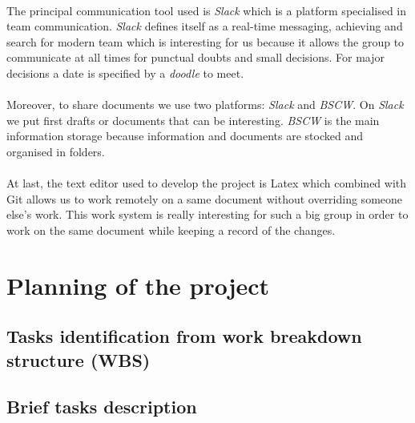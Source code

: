 \documentclass[12pt, titlepage]{scrartcl}
\begin{document}
\paragraph{}
The principal communication tool used is \textit{Slack} which is a platform specialised in team communication. \textit{Slack} defines itself as a real-time messaging, achieving and search for modern team which is interesting for us because it allows the group to communicate at all times for punctual doubts and small decisions. For major decisions a date is specified by a \textit{doodle} to meet.
\paragraph{}
Moreover, to share documents we use two platforms: \textit{Slack} and \textit{BSCW}. On \textit{Slack} we put first drafts or documents that can be interesting. \textit{BSCW} is the main information storage because information and documents are stocked and organised in folders.
\paragraph{}
At last, the text editor used to develop the project is Latex which combined with Git allows us to work remotely on a same document without overriding someone else's work. This work system is really interesting for such a big group in order to work on the same document while keeping a record of the changes. 

\section{Planning of the project}

\subsection{Tasks identification from work breakdown structure (WBS)}
%

\subsection{Brief tasks description}







\end{document}
